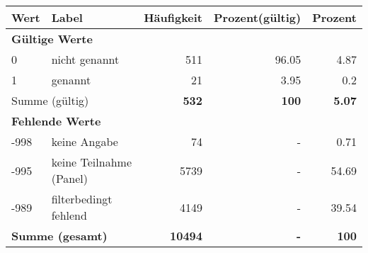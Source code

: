      \begin{longtable}{lXrrr}
     \toprule
     \textbf{Wert} & \textbf{Label} & \textbf{Häufigkeit} & \textbf{Prozent(gültig)} & \textbf{Prozent} \\
     \endhead
     \midrule
     \multicolumn{5}{l}{\textbf{Gültige Werte}}\\

     0 &
     \multicolumn{1}{X}{ nicht genannt   } &


       \num{511} &
       \num[round-mode=places,round-precision=2]{96.05} &
         \num[round-mode=places,round-precision=2]{4.87} \\

     1 &
     \multicolumn{1}{X}{ genannt   } &


       \num{21} &
       \num[round-mode=places,round-precision=2]{3.95} &
         \num[round-mode=places,round-precision=2]{0.2} \\
     \midrule
     \multicolumn{2}{l}{Summe (gültig)} &
       \textbf{\num{532}} &
     \textbf{\num{100}} &
       \textbf{\num[round-mode=places,round-precision=2]{5.07}} \\
     \multicolumn{5}{l}{\textbf{Fehlende Werte}}\\
       -998 &
       keine Angabe &
         \num{74} &
        - &
         \num[round-mode=places,round-precision=2]{0.71} \\
       -995 &
       keine Teilnahme (Panel) &
         \num{5739} &
        - &
         \num[round-mode=places,round-precision=2]{54.69} \\
       -989 &
       filterbedingt fehlend &
         \num{4149} &
        - &
         \num[round-mode=places,round-precision=2]{39.54} \\
     \midrule
     \multicolumn{2}{l}{\textbf{Summe (gesamt)}} &
          \textbf{\num{10494}} &
        \textbf{-} &
        \textbf{\num{100}} \\
     \bottomrule
     \end{longtable}
     
